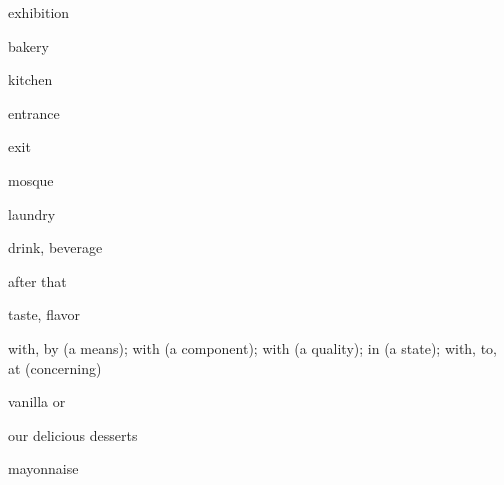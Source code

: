 \begin{flashcard}{\LARGE exhibition}
\LARGE {}
\end{flashcard}
\begin{flashcard}{\LARGE bakery}
\LARGE {}
\end{flashcard}
\begin{flashcard}{\LARGE kitchen}
\LARGE {}
\end{flashcard}
\begin{flashcard}{\LARGE entrance}
\LARGE {}
\end{flashcard}
\begin{flashcard}{\LARGE exit}
\LARGE {}
\end{flashcard}
\begin{flashcard}{\LARGE mosque}
\LARGE {}
\end{flashcard}
\begin{flashcard}{\LARGE laundry}
\LARGE {}
\end{flashcard}
\begin{flashcard}{\LARGE drink, beverage}
\LARGE {}
\end{flashcard}
\begin{flashcard}{\LARGE after that}
\LARGE {}
\end{flashcard}
\begin{flashcard}{\LARGE taste, flavor}
\LARGE {}
\end{flashcard}
\begin{flashcard}{\LARGE with, by (a means); with (a component); with (a quality); in (a state); with, to, at (concerning)}
\LARGE {}
\end{flashcard}
\begin{flashcard}{\LARGE vanilla}
\LARGE {} or 
\end{flashcard}
\begin{flashcard}{\LARGE our delicious desserts}
\LARGE {}
\end{flashcard}
\begin{flashcard}{\LARGE mayonnaise}
\LARGE {}
\end{flashcard}
